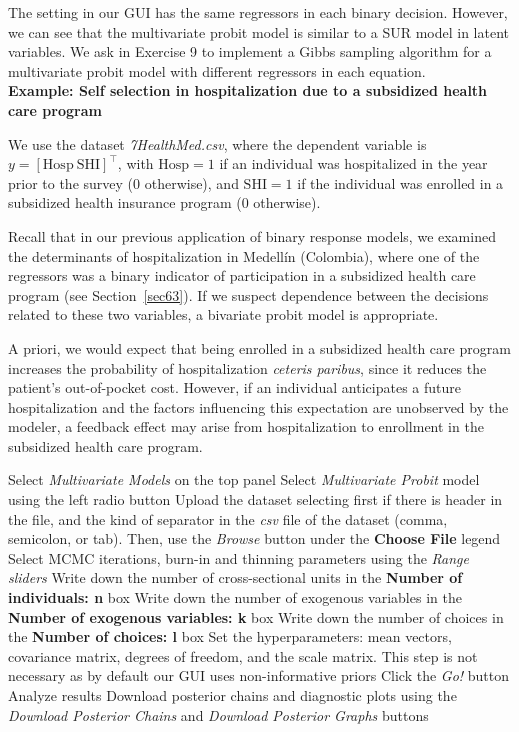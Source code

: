 The setting in our GUI has the same regressors in each binary decision. However, we can see that the multivariate probit model is similar to a SUR model in latent variables. We ask in Exercise 9 to implement a Gibbs sampling algorithm for a multivariate probit model with different regressors in each equation.\\

\textbf{Example: Self selection in hospitalization due to a subsidized health care program}

We use the dataset \textit{7HealthMed.csv}, where the dependent variable is \( y = [\text{Hosp} \ \text{SHI}]^{\top} \), with \(\text{Hosp} = 1\) if an individual was hospitalized in the year prior to the survey (0 otherwise), and \(\text{SHI} = 1\) if the individual was enrolled in a subsidized health insurance program (0 otherwise).

Recall that in our previous application of binary response models, we examined the determinants of hospitalization in Medellín (Colombia), where one of the regressors was a binary indicator of participation in a subsidized health care program (see Section~\ref{sec63}). If we suspect dependence between the decisions related to these two variables, a bivariate probit model is appropriate. 

A priori, we would expect that being enrolled in a subsidized health care program increases the probability of hospitalization \textit{ceteris paribus}, since it reduces the patient’s out-of-pocket cost. However, if an individual anticipates a future hospitalization and the factors influencing this expectation are unobserved by the modeler, a feedback effect may arise from hospitalization to enrollment in the subsidized health care program.

\begin{algorithm}[h!]
	\caption{Multivariate probit model}\label{alg:MtultProbit}
	\begin{algorithmic}[1]  		 			
		\State Select \textit{Multivariate Models} on the top panel
		\State Select \textit{Multivariate Probit} model using the left radio button
		\State Upload the dataset selecting first if there is header in the file, and the kind of separator in the \textit{csv} file of the dataset (comma, semicolon, or tab). Then, use the \textit{Browse} button under the \textbf{Choose File} legend
		\State Select MCMC iterations, burn-in and thinning parameters using the \textit{Range sliders}
		\State Write down the number of cross-sectional units in the \textbf{Number of individuals: n} box
		\State Write down the number of exogenous variables in the \textbf{Number of exogenous variables: k} box
		\State Write down the number of choices in the \textbf{Number of choices: l} box
		\State Set the hyperparameters: mean vectors, covariance matrix, degrees of freedom, and the scale matrix. This step is not necessary as by default our GUI uses non-informative priors
		\State Click the \textit{Go!} button
		\State Analyze results
		\State Download posterior chains and diagnostic plots using the \textit{Download Posterior Chains} and \textit{Download Posterior Graphs} buttons
	\end{algorithmic} 
\end{algorithm}

